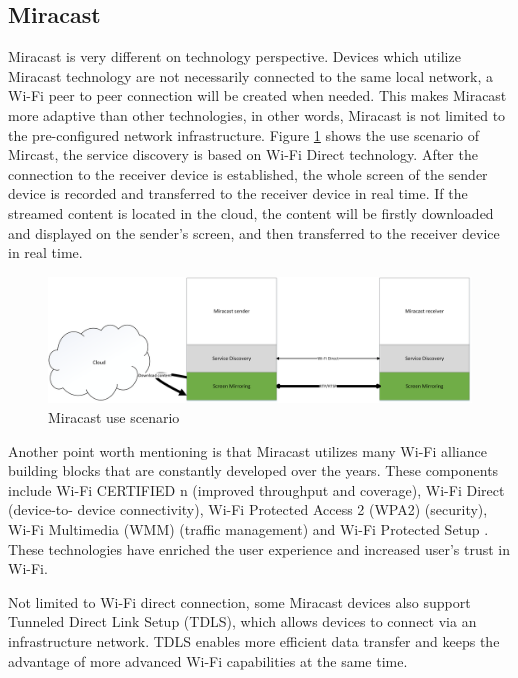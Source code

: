 \subsection{Miracast\label{2_2_5}} %
Miracast \cite{miracast_industry} is very different on technology perspective.
Devices which utilize Miracast technology are not necessarily connected to
the same local network, a Wi-Fi peer to peer connection will be created when
needed. This makes Miracast more adaptive than other technologies, in other
words, Miracast is not limited to the pre-configured network infrastructure.
Figure \ref{miracast_use_scenario} shows the use scenario of Mircast, the
service discovery is based on Wi-Fi Direct technology. After the connection to
the receiver device is established, the whole screen of the sender device is
recorded and transferred to the receiver device in real time. If the streamed
content is located in the cloud, the content will be firstly downloaded and
displayed on the sender's screen, and then transferred to the receiver device in
real time.

\begin{figure}[htb] 
\centering \includegraphics[width=1\columnwidth]{charts/miracast} 
\caption{Miracast use scenario\label{miracast_use_scenario}} 
\end{figure}  

Another point worth mentioning is that Miracast utilizes many Wi-Fi alliance
building blocks that are constantly developed over the years. These components
include Wi-Fi CERTIFIED n (improved throughput and coverage), Wi-Fi Direct
(device-to- device connectivity), Wi-Fi Protected Access 2 (WPA2) (security),
Wi-Fi Multimedia (WMM) (traffic management) and Wi-Fi Protected
Setup \cite{miracast_industry}. These technologies have enriched the user
experience and increased user's trust in Wi-Fi.

Not limited to Wi-Fi direct connection, some Miracast devices also support Tunneled Direct Link Setup (TDLS), which allows devices to connect via an infrastructure network. TDLS enables more efficient data transfer and keeps the advantage of more advanced Wi-Fi capabilities at the same time.

